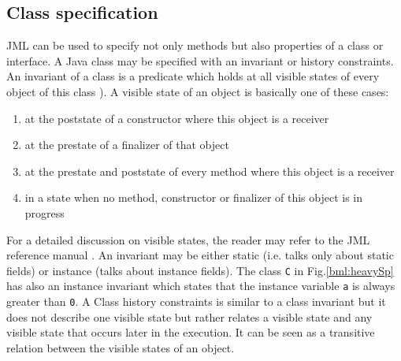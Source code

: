 \subsection{Class specification} \label{javaVerif:JML:classSpec}
JML can be used to specify not only methods but also properties of a class or interface. 
A Java class may be specified with an invariant or history constraints. An invariant of a class is a predicate which holds at all visible states of
  every object of this class ).
A visible state of an object is basically one of these cases:
\begin{enumerate}   
   \item at the poststate of a constructor where this object is a receiver
   \item at the prestate of a finalizer of that object 
   \item at the prestate and poststate of every method where this object is a receiver
   \item in a state when no method, constructor or finalizer of this object  is in progress 
\end{enumerate} 
For a detailed discussion on visible states, the reader may refer to the JML reference manual \cite{JMLRefMan}.
 An invariant may be either static (i.e. talks only about static fields) or instance (talks about instance fields). 
 The class \texttt{C}  in Fig.\ref{bml:heavySp} has also an instance invariant which states that the instance variable \texttt{a} is
 always greater than \texttt{0}. A Class history constraints is similar to a class invariant but it does not describe one visible
 state but rather relates  a visible state and any visible state that occurs later in the execution. It can be seen as a transitive relation between the 
 visible states of an object.

